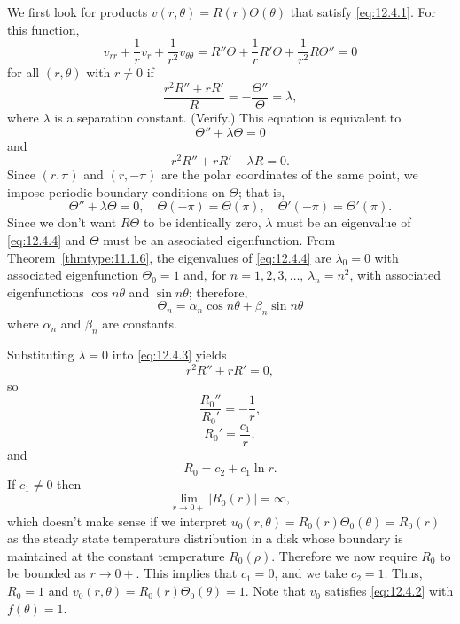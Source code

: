 We first look for products $v(r,\theta)=R(r)\Theta(\theta)$ that satisfy \eqref{eq:12.4.1}. For this
function,
\[
  v_{rr}+\frac{1}{r}v_{r}+\frac{1}{r^{2}}v_{\theta\theta}= R''\Theta+\frac{1}{r}R'\Theta +\frac{1}{r^{2}}R\Theta''=0
\]
for all $(r,\theta)$ with $r\ne0$ if
\[
  \frac{r^{2}R''+rR'}{R}=-\frac{\Theta''}{\Theta}=\lambda,
\]
where $\lambda$ is a separation constant. (Verify.) This equation is equivalent to
\[
  \Theta''+\lambda\Theta=0
\]
and
\begin{equation}
  \label{eq:12.4.3}r^{2}R''+rR'-\lambda R=0.
\end{equation}
Since $(r,\pi)$ and $(r,-\pi)$ are the polar coordinates of the same point, we impose periodic
boundary conditions on $\Theta$; that is,
\begin{equation}
  \label{eq:12.4.4}\Theta''+\lambda\Theta=0,\quad\Theta(-\pi)=\Theta(\pi), \quad\Theta'(-\pi)=\Theta'(\pi).
\end{equation}
Since we don't want $R\Theta$ to be identically zero, $\lambda$ must be an eigenvalue of
\eqref{eq:12.4.4} and $\Theta$ must be an associated eigenfunction. From
Theorem~\ref{thmtype:11.1.6}, the eigenvalues of \eqref{eq:12.4.4} are $\lambda_{0}=0$ with
associated eigenfunction $\Theta_{0}=1$ and, for $n=1,2,3,\dots$, $\lambda_{n}=n^{2}$, with
associated eigenfunctions $\cos n\theta$ and $\sin n\theta$; therefore,
\[
  \Theta_{n}=\alpha_{n}\cos n\theta+\beta_{n}\sin n\theta
\]
where $\alpha_{n}$ and $\beta_{n}$ are constants.

Substituting $\lambda=0$ into \eqref{eq:12.4.3} yields \[
  r^{2}R''+rR'=0,
\]
so
\[
  \frac{R_{0}''}{R_{0}'}=-\frac{1}{r},
\]
\[
  R_{0}'=\frac{c_{1}}{r},
\]
and
\begin{equation}
  \label{eq:12.4.5}R_{0}=c_{2}+c_{1}\ln r.
\end{equation}
If $c_{1}\ne0$ then
\[
  \lim_{r\to0+}|R_{0}(r)|=\infty,
\]
which doesn't make sense if we interpret $u_{0}(r,\theta)=R_{0}(r)\Theta_{0}(\theta)=R_{0}(r)$ as
the steady state temperature distribution in a disk whose boundary is maintained at the constant
temperature $R_{0}(\rho)$. Therefore we now require $R_{0}$ to be bounded as $r\to0+$. This implies
that $c_{1}=0$, and we take $c_{2}=1$. Thus, $R_{0}=1$ and
$v_{0}(r,\theta)=R_{0}(r)\Theta_{0}(\theta)=1$. Note that $v_{0}$ satisfies \eqref{eq:12.4.2} with
$f(\theta)=1$.

